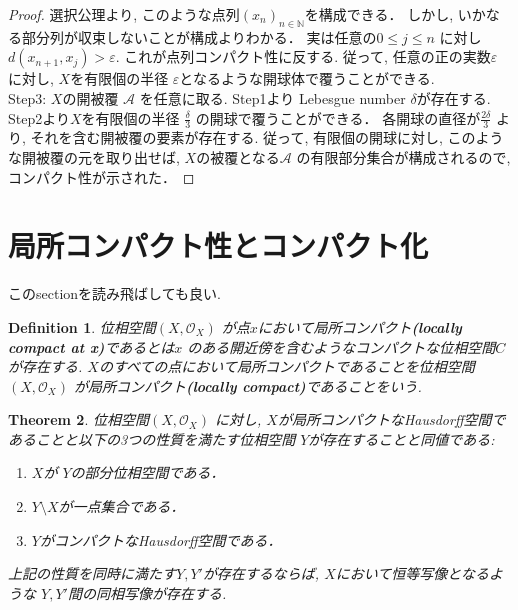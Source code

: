 \documentclass[lualatex]{ltjsbook}
\newtheorem{theorem}{Theorem}[chapter]
\newtheorem{definition}[theorem]{Definition}
\theoremstyle{remark}
\theoremstyle{plain}
\begin{document}
\begin{proof}
	 選択公理より,  このような点列$\left( x_n \right) _{n \in  \mathbb{N}}$を構成できる．
	 しかし,  いかなる部分列が収束しないことが構成よりわかる．
	 実は任意の$0 \le j \le n$ に対し$d(x_{n+1}, x_j)>\varepsilon$. 
	 これが点列コンパクト性に反する. 
	 従って,  任意の正の実数$\varepsilon$ に対し,  $X$を有限個の半径 $\varepsilon$となるような開球体で覆うことができる.\\
	 Step3:  $X$の開被覆 $\mathcal{A}$ を任意に取る. 
	 Step1より Lebesgue number $\delta$が存在する. 
	 Step2より$X$を有限個の半径 $\frac{\delta}{3}$ の開球で覆うことができる．
	 各開球の直径が$\frac{2\delta}{3}$ より,  
	 それを含む開被覆の要素が存在する. 
	 従って, 有限個の開球に対し,  このような開被覆の元を取り出せば, 
	 $X$の被覆となる$\mathcal{A}$ の有限部分集合が構成されるので,  
	 コンパクト性が示された．
\end{proof}

\section{局所コンパクト性とコンパクト化}
このsectionを読み飛ばしても良い. 
\begin{definition}
	位相空間$\left( X ,  \mathcal{O}_{X} \right)$ が点$x$において局所コンパクト\textbf{(locally compact at x)}であるとは$x$ のある開近傍を含むようなコンパクトな位相空間$C$が存在する.  $X$のすべての点において局所コンパクトであることを位相空間 $\left( X ,  \mathcal{O}_{X} \right)$ 
  が局所コンパクト\textbf{(locally compact)}であることをいう.
\end{definition}

\begin{theorem}
	位相空間$\left( X ,  \mathcal{O}_{X} \right)$ に対し,  $X$が局所コンパクトなHausdorff空間であることと以下の3つの性質を満たす位相空間 $Y$が存在することと同値である:
	 \begin{enumerate}
		\item $X$が $Y$の部分位相空間である．
		\item $Y \setminus X$が一点集合である．
		\item $Y$がコンパクトなHausdorff空間である．
	\end{enumerate}
	上記の性質を同時に満たす$Y, Y'$が存在するならば,   $X$において恒等写像となるような $Y, Y'$間の同相写像が存在する.
\end{theorem}
\end{document}
